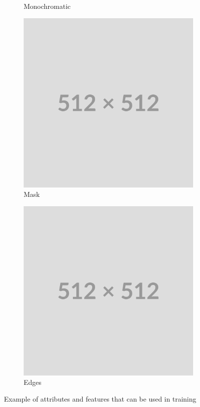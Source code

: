 \begin{figure}[h]
\begin{subfigure}[b]{0.24\textwidth}
        \caption{Monochromatic}
    \end{subfigure}
    \begin{subfigure}[b]{0.24\textwidth}
        \centering
        \includegraphics[width=\textwidth]{img/placeholder512.png}
        \caption{Mask}
    \end{subfigure}
    \begin{subfigure}[b]{0.24\textwidth}
        \centering
        \includegraphics[width=\textwidth]{img/placeholder512.png}
        \caption{Edges}
    \end{subfigure}
    \caption{Example of attributes and features that can be used in training}
    \label{f:ex-signal-attributes}
\end{figure}

